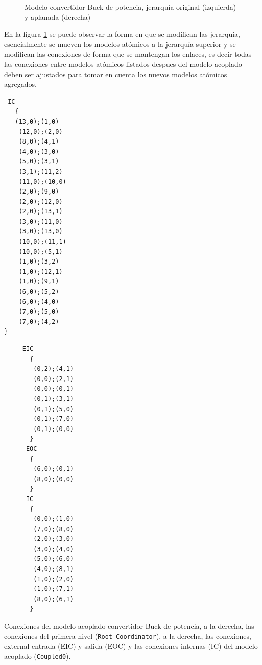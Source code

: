 \begin{figure}[H]
{\begin{minipage}[t][][b]{.59\textwidth}
        \end{minipage}%
}       
        \caption{Modelo convertidor Buck de potencia, jerarquía original (izquierda) y aplanada (derecha)}
        \label{fig:coupled-tree}
\end{figure}

        En la figura \ref{fig:coupled-tree} se puede observar la forma en que se modifican las jerarquía, esencialmente se mueven los modelos atómicos 
        a la jerarquía superior y se modifican las conexiones de forma que se mantengan los enlaces, es decir todas las conexiones entre modelos atómicos 
        listados despues del modelo acoplado deben ser ajustados para tomar en cuenta los nuevos modelos atómicos agregados.

\begin{listing}
\begin{minipage}[t]{0.5\linewidth}
\centering
\begin{verbatim}
 IC
   {
   (13,0);(1,0)
    (12,0);(2,0)
    (8,0);(4,1)
    (4,0);(3,0)
    (5,0);(3,1)
    (3,1);(11,2)
    (11,0);(10,0)
    (2,0);(9,0)
    (2,0);(12,0)
    (2,0);(13,1)
    (3,0);(11,0)
    (3,0);(13,0)
    (10,0);(11,1)
    (10,0);(5,1)
    (1,0);(3,2)
    (1,0);(12,1)
    (1,0);(9,1)
    (6,0);(5,2)
    (6,0);(4,0)
    (7,0);(5,0)
    (7,0);(4,2)
}
\end{verbatim}
\end{minipage}
\begin{minipage}[t]{0.5\linewidth}
\begin{verbatim}
     EIC
       {
        (0,2);(4,1)
        (0,0);(2,1)
        (0,0);(0,1)
        (0,1);(3,1)
        (0,1);(5,0)
        (0,1);(7,0)
        (0,1);(0,0)
       }
      EOC
       {
        (6,0);(0,1)
        (8,0);(0,0)
       }
      IC
       {
        (0,0);(1,0)
        (7,0);(8,0)
        (2,0);(3,0)
        (3,0);(4,0)
        (5,0);(6,0)
        (4,0);(8,1)
        (1,0);(2,0)
        (1,0);(7,1)
        (8,0);(6,1)
       }
\end{verbatim}
\end{minipage}
\label{lst:connections}
\caption{Conexiones del modelo acoplado convertidor Buck de potencia, a la derecha, las conexiones del primera nivel (\texttt{Root Coordinator}), a la derecha, 
        las conexiones, external entrada (EIC) y salida (EOC) y las conexiones internas (IC) del modelo acoplado (\texttt{Coupled0}).}
\end{listing}

